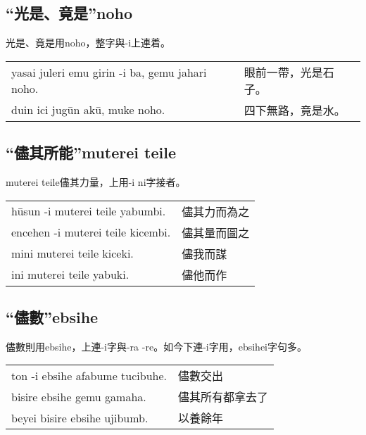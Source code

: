 \documentclass{article}
\begin{document}
\subsection{“光是、竟是”noho}
\noindent 光是、竟是用noho，整字與-i上連着。
\begin{center}
    \begin{tabularx}{\textwidth}{XX}
        yasai juleri emu girin -i ba, gemu jahari noho. & 眼前一帶，光是石子。\\
        duin ici jug\={u}n ak\={u}, muke noho. & 四下無路，竟是水。
    \end{tabularx}
\end{center}

\subsection{“儘其所能”muterei teile}
\noindent muterei teile儘其力量，上用-i ni字接者。
\begin{center}
    \begin{tabularx}{\textwidth}{XX}
        h\={u}sun -i muterei teile yabumbi. & 儘其力而為之\\
        encehen -i muterei teile kicembi. & 儘其量而圖之\\
        mini muterei teile kiceki. & 儘我而謀\\
        ini muterei teile yabuki. & 儘他而作
    \end{tabularx}
\end{center}

\subsection{“儘數”ebsihe}
\noindent 儘數則用ebsihe，上連-i字與-ra -re。如今下連-i字用，ebsihei字句多。
\begin{center}
    \begin{tabularx}{\textwidth}{XX}
        ton -i ebsihe afabume tucibuhe. & 儘數交出\\
        bisire ebsihe gemu gamaha. & 儘其所有都拿去了\\
        beyei bisire ebsihe ujibumb. & 以養餘年
    \end{tabularx}
\end{center}
\end{document}
